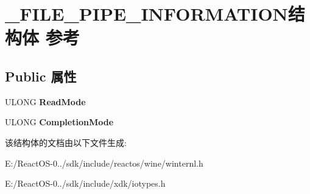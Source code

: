 \hypertarget{struct___f_i_l_e___p_i_p_e___i_n_f_o_r_m_a_t_i_o_n}{}\section{\+\_\+\+F\+I\+L\+E\+\_\+\+P\+I\+P\+E\+\_\+\+I\+N\+F\+O\+R\+M\+A\+T\+I\+O\+N结构体 参考}
\label{struct___f_i_l_e___p_i_p_e___i_n_f_o_r_m_a_t_i_o_n}
\subsection*{Public 属性}
\begin{DoxyCompactItemize}
\item 
\mbox{\label{struct___f_i_l_e___p_i_p_e___i_n_f_o_r_m_a_t_i_o_n_a0edaba2081bff4aec832ab28a82fce60}} 
U\+L\+O\+NG {\bfseries Read\+Mode}
\item 
\mbox{\label{struct___f_i_l_e___p_i_p_e___i_n_f_o_r_m_a_t_i_o_n_ab91cf3a2503cd522e1daf703dcea3fd9}} 
U\+L\+O\+NG {\bfseries Completion\+Mode}
\end{DoxyCompactItemize}


该结构体的文档由以下文件生成\+:\begin{DoxyCompactItemize}
\item 
E\+:/\+React\+O\+S-\/0../sdk/include/reactos/wine/winternl.\+h\item 
E\+:/\+React\+O\+S-\/0../sdk/include/xdk/iotypes.\+h\end{DoxyCompactItemize}

